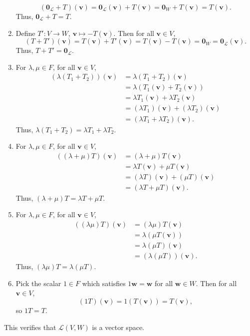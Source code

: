\documentclass[10pt]{article}
\def\v{\bm{v}}
\def\w{\bm{w}}
\def\L{\mathcal{L}}
\begin{document}
\begin{enumerate}
\[                        (\mathbf{0}_\L + T)(\v) = \mathbf{0}_\L(\v) + T(\v) = \mathbf{0}_W + T(\v) = T(\v).
                \]
                Thus, $\mathbf{0}_\L + T = T$.
                \item 
                Define $T'\colon V \to W$, $\v \mapsto -T(\v)$. Then for all $\v \in V$,
                \[
                        (T + T')(\v) = T(\v) + T'(\v) = T(\v) - T(\v) = \mathbf{0}_W = \mathbf{0}_\L(\v).
                \]
                Thus, $T + T' = \mathbf{0}_\L$.
                \item 
                For $\lambda, \mu \in F$, for all $\v \in V$,
                \begin{align*}
                        (\lambda (T_1 + T_2))(\v) &= \lambda (T_1 + T_2)(\v) \\
                                &= \lambda(T_1(\v) + T_2(\v)) \\
                                &= \lambda T_1(\v) + \lambda T_2(\v) \\
                                &= (\lambda T_1)(\v) + (\lambda T_2)(\v) \\
                                &= (\lambda T_1 + \lambda T_2)(\v).
                \end{align*}
                Thus, $\lambda (T_1 + T_2) = \lambda T_1 + \lambda T_2$.
                \item 
                For $\lambda, \mu \in F$, for all $\v \in V$,
                \begin{align*}
                        ((\lambda + \mu)T)(\v) &= (\lambda + \mu)T(\v) \\
                                &= \lambda T(\v) + \mu T(\v) \\
                                &= (\lambda T)(\v) + (\mu T)(\v) \\
                                &= (\lambda T + \mu T)(\v).
                \end{align*}
                Thus, $(\lambda + \mu)T = \lambda T + \mu T$.

                \item 
                For $\lambda, \mu \in F$, for all $\v \in V$,
                \begin{align*}
                        ((\lambda \mu)T)(\v) &= (\lambda \mu) T(\v) \\
                                &= \lambda (\mu T(\v)) \\
                                &= \lambda (\mu T)(\v) \\
                                &= (\lambda (\mu T))(\v).
                \end{align*}
                Thus, $(\lambda \mu) T = \lambda (\mu T)$.
                
                \item 
                Pick the scalar $1 \in F$ which satisfies $1\w = \w$ for all $\w \in W$. Then for all $\v\in V$,
                \[
                        (1T)(\v) = 1(T(\v)) = T(\v),
                \]
                so $1T = T$.
        \end{enumerate}
        This verifies that $\L(V, W)$ is a vector space. \\
\end{document}
